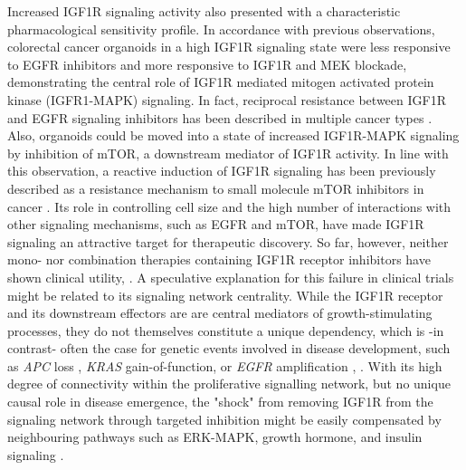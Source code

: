 \begin{flushleft}
Increased IGF1R signaling activity also presented with a characteristic pharmacological sensitivity profile. In accordance with previous observations\parencite{yaoCombinedIGF1RMEK2016}, colorectal cancer organoids in a high IGF1R signaling state were less responsive to EGFR inhibitors and more responsive to IGF1R and MEK blockade, demonstrating the central role of IGF1R mediated mitogen activated protein kinase (IGFR1-MAPK) signaling. In fact, reciprocal resistance between IGF1R and EGFR signaling inhibitors has been described in multiple cancer types \parencite{huaInsulinlikeGrowthFactor2020a}. Also, organoids could be moved into a state of increased IGF1R-MAPK signaling by inhibition of mTOR, a downstream mediator of IGF1R activity. In line with this observation, a reactive induction of IGF1R signaling has been previously described as a resistance mechanism to small molecule mTOR inhibitors in cancer \parencite{sharma_chromatin-mediated_2010, yoonFocalAdhesionIGF1RDependent2017a}. Its role in controlling cell size and the high number of interactions with other signaling mechanisms, such as EGFR and mTOR, have made IGF1R signaling an attractive target for therapeutic discovery. So far, however, neither mono- nor combination therapies containing IGF1R receptor inhibitors have shown clinical utility\parencite{beckwithMinireviewWereIGF2015}, \parencite{CostsCausesOncologya}. A speculative explanation for this failure in clinical trials might be related to its signaling network centrality. While the IGF1R receptor and its downstream effectors are are central mediators of growth-stimulating processes, they do not themselves constitute a unique dependency, which is -in contrast- often the case for genetic events involved in disease development, such as \textit{APC} loss \parencite{Dow2015-pc}, \textit{KRAS} gain-of-function, or \textit{EGFR} amplification \parencite{katoRevisitingEpidermalGrowth2019}, \parencite{randonEGFRAmplificationMetastatic2021}. With its high degree of connectivity within the proliferative signalling network, but no unique causal role in disease emergence, the "shock" from removing IGF1R from the signaling network through targeted inhibition might be easily compensated by neighbouring pathways such as ERK-MAPK, growth hormone, and insulin signaling \parencite{beckwithMinireviewWereIGF2015}.
\par


\end{flushleft}
